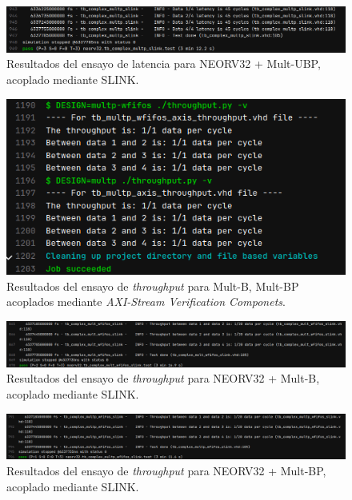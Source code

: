\begin{figure}[H]
    \centering
    \includegraphics[width=14cm]{Figuras/result/lat4.png}
    \caption{Resultados del ensayo de latencia para NEORV32 + Mult-UBP, acoplado mediante SLINK.}
    \label{fig:lat4}
\end{figure}

\begin{figure}[H]
    \centering
    \includegraphics[width=14cm]{Figuras/result/thr1.png}
    \caption{Resultados del ensayo de \textit{throughput} para Mult-B, Mult-BP acoplados mediante \textit{AXI-Stream Verification Componets}.}
    \label{fig:thr1}
\end{figure}

\begin{figure}[H]
    \centering
    \includegraphics[width=14cm]{Figuras/result/thr2.png}
    \caption{Resultados del ensayo de \textit{throughput} para NEORV32 + Mult-B, acoplado mediante SLINK.}
    \label{fig:thr2}
\end{figure}

\begin{figure}[H]
    \centering
    \includegraphics[width=14cm]{Figuras/result/thr3.png}
    \caption{Resultados del ensayo de \textit{throughput} para NEORV32 + Mult-BP, acoplado mediante SLINK.}
    \label{fig:thr3}
\end{figure}


